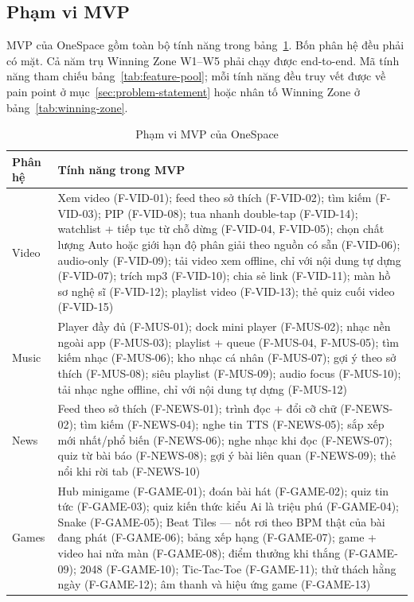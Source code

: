 \subsection{Phạm vi MVP}
\label{sec:mvp-scope}

MVP của OneSpace gồm toàn bộ tính năng trong bảng~\ref{tab:mvp-scope-full}. Bốn phân hệ đều phải có mặt. Cả năm trụ Winning Zone W1--W5 phải chạy được end-to-end. Mã tính năng tham chiếu bảng~\ref{tab:feature-pool}; mỗi tính năng đều truy vết được về pain point ở mục~\ref{sec:problem-statement} hoặc nhân tố Winning Zone ở bảng~\ref{tab:winning-zone}.

\begin{table}[H]
\centering
\caption{Phạm vi MVP của OneSpace}
\label{tab:mvp-scope-full}
\begin{tabularx}{\textwidth}{>{\raggedright\arraybackslash}p{1.8cm} >{\raggedright\arraybackslash}X}
    \toprule
    \textbf{Phân hệ} & \textbf{Tính năng trong MVP} \\
    \midrule
    Video & Xem video (F-VID-01); feed theo sở thích (F-VID-02); tìm kiếm (F-VID-03); PIP (F-VID-08); tua nhanh double-tap (F-VID-14); watchlist + tiếp tục từ chỗ dừng (F-VID-04, F-VID-05); chọn chất lượng Auto hoặc giới hạn độ phân giải theo nguồn có sẵn (F-VID-06); audio-only (F-VID-09); tải video xem offline, chỉ với nội dung tự dựng (F-VID-07); trích mp3 (F-VID-10); chia sẻ link (F-VID-11); màn hồ sơ nghệ sĩ (F-VID-12); playlist video (F-VID-13); thẻ quiz cuối video (F-VID-15) \\
    Music & Player đầy đủ (F-MUS-01); dock mini player (F-MUS-02); nhạc nền ngoài app (F-MUS-03); playlist + queue (F-MUS-04, F-MUS-05); tìm kiếm nhạc (F-MUS-06); kho nhạc cá nhân (F-MUS-07); gợi ý theo sở thích (F-MUS-08); siêu playlist (F-MUS-09); audio focus (F-MUS-10); tải nhạc nghe offline, chỉ với nội dung tự dựng (F-MUS-12) \\
    News & Feed theo sở thích (F-NEWS-01); trình đọc + đổi cỡ chữ (F-NEWS-02); tìm kiếm (F-NEWS-04); nghe tin TTS (F-NEWS-05); sắp xếp mới nhất/phổ biến (F-NEWS-06); nghe nhạc khi đọc (F-NEWS-07); quiz từ bài báo (F-NEWS-08); gợi ý bài liên quan (F-NEWS-09); thẻ nổi khi rời tab (F-NEWS-10) \\
    Games & Hub minigame (F-GAME-01); đoán bài hát (F-GAME-02); quiz tin tức (F-GAME-03); quiz kiến thức kiểu Ai là triệu phú (F-GAME-04); Snake (F-GAME-05); Beat Tiles --- nốt rơi theo BPM thật của bài đang phát (F-GAME-06); bảng xếp hạng (F-GAME-07); game + video hai nửa màn (F-GAME-08); điểm thưởng khi thắng (F-GAME-09); 2048 (F-GAME-10); Tic-Tac-Toe (F-GAME-11); thử thách hằng ngày (F-GAME-12); âm thanh và hiệu ứng game (F-GAME-13) \\

\end{tabularx}
\end{table}
